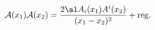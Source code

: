 \begin{equation}
{\cal A}(x_1){\cal A}(x_2)=  
\frac{2\al A_i(x_1)A^i(x_2)}{(x_1-x_2)^2}+\mbox{reg}.
\end{equation}

